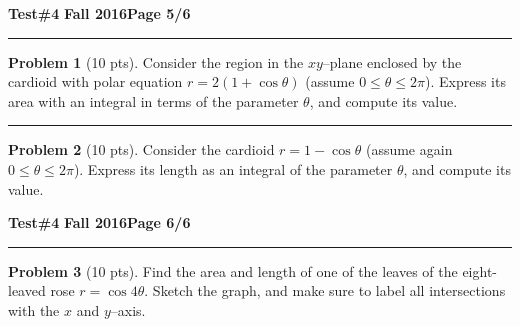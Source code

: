 \documentclass[12pt]{article}
\theoremstyle{definition}
\newtheorem{problem}{Problem}
\begin{document}
\hfill{\large\bf Test\#4}\hfill{\large\bf
  Fall 2016}\hfill{\large\bf Page 5/6}\hrule
  
\bigskip
\begin{problem}[10 pts]
Consider the region in the $xy$--plane enclosed by the cardioid with polar equation $r = 2(1+\cos \theta)$ (assume $0 \leq \theta \leq 2\pi$).  Express its area with an integral in terms of the parameter $\theta$, and compute its value.
\vspace{8cm}
\begin{flushright}
\end{flushright}
\end{problem}
\hrule

\begin{problem}[10 pts]
Consider the cardioid $r = 1 - \cos \theta$ (assume again $0 \leq \theta \leq 2\pi$).  Express its length as an integral of the parameter $\theta$, and compute its value.
\vspace{8cm}
\begin{flushright}
\end{flushright}
\end{problem}
\newpage

\hfill{\large\bf Test\#4}\hfill{\large\bf
  Fall 2016}\hfill{\large\bf Page 6/6}\hrule

\bigskip
\begin{problem}[10 pts]
Find the area and length of one of the leaves of the eight-leaved rose $r = \cos 4\theta$.  Sketch the graph, and make sure to label all intersections with the $x$ and $y$--axis.
\end{problem}
\vspace{18cm}
\begin{flushright}
\end{flushright}
\end{document}
